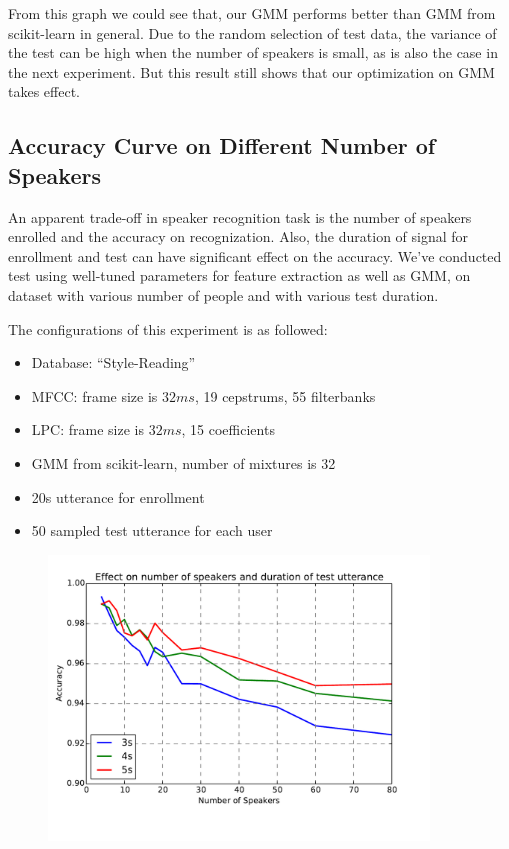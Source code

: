 From this graph we could see that, our GMM performs better than GMM from scikit-learn in general.
Due to the random selection of test data,
the variance of the test can be high when the number of speakers is small,
as is also the case in the next experiment. But this result still shows that
our optimization on GMM takes effect.

\subsection{Accuracy Curve on Different Number of Speakers}

An apparent trade-off in speaker recognition task is the number of speakers
enrolled and the accuracy on recognization.
Also, the duration of signal for enrollment and test can have significant effect on the accuracy.
We've conducted test using well-tuned parameters for feature extraction as well as GMM, on dataset with
various number of people and with various test duration.

The configurations of this experiment is as followed:
\begin{itemize}
  \item Database: ``Style-Reading''
  \item MFCC: frame size is $32 ms $, 19 cepstrums, 55 filterbanks
  \item LPC: frame size is $32 ms $, 15 coefficients
  \item GMM from scikit-learn, number of mixtures is 32
  \item 20s utterance for enrollment
  \item 50 sampled test utterance for each user
\end{itemize}

\begin{figure}[H]
  \centering
  \includegraphics[width=0.9\textwidth]{img/performance.pdf}
\end{figure}

